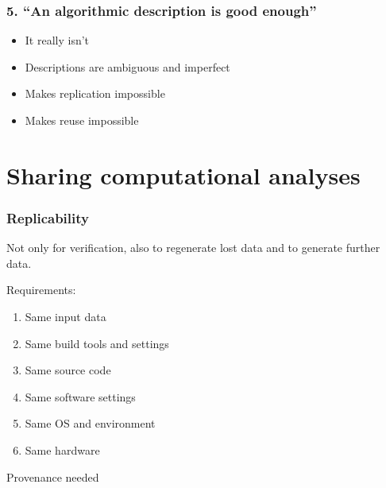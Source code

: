 \documentclass[slidestop]{beamer}
\begin{document}

\begin{frame}
  \frametitle{5. ``An algorithmic description is good enough''}
  \pause
  \begin{itemize}
    \item It really isn't
    \item Descriptions are ambiguous and imperfect
    \item Makes replication impossible
    \item Makes reuse impossible
  \end{itemize}
\end{frame}

\section*{}


\section{Sharing computational analyses}

\begin{frame}
  \frametitle{Replicability}
  Not only for verification, also to regenerate lost data and to generate
  further data.

  \vspace{0.5cm}
  \pause

  Requirements:
  \begin{enumerate}
    \item Same input data
    \item Same build tools and settings
    \item Same source code
    \item Same software settings
    \item Same OS and environment
    \item Same hardware
  \end{enumerate}

  \vspace{0.5cm}
  \pause

  Provenance needed
\end{frame}
\end{document}
